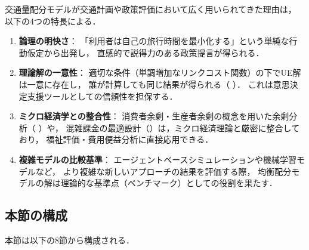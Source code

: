 交通量配分モデルが交通計画や政策評価において広く用いられてきた理由は，
以下の4つの特長による\cite{土木学会1998}．

\begin{enumerate}
  \item \textbf{論理の明快さ}：
    「利用者は自己の旅行時間を最小化する」という単純な行動仮定から出発し，
    直感的で説得力のある政策提言が得られる．

  \item \textbf{理論解の一意性}：
    適切な条件（単調増加なリンクコスト関数）の下でUE解は一意に存在し，
    誰が計算しても同じ結果が得られる（ ）．
    これは意思決定支援ツールとしての信頼性を担保する．

  \item \textbf{ミクロ経済学との整合性}：
    消費者余剰・生産者余剰の概念を用いた余剰分析（ ）や，
    混雑課金の最適設計（）は，ミクロ経済理論と厳密に整合しており，
    福祉評価・費用便益分析に直接応用できる．

  \item \textbf{複雑モデルの比較基準}：
    エージェントベースシミュレーションや機械学習モデルなど，
    より複雑な新しいアプローチの結果を評価する際，
    均衡配分モデルの解は理論的な基準点（ベンチマーク）としての役割を果たす．
\end{enumerate}

\subsection*{本節の構成}

本節は以下の8節から構成される．

